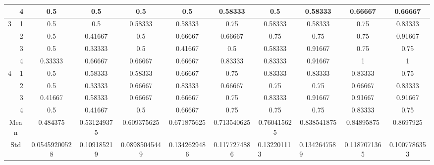 \documentclass[draft,dvipsnames]{drexel-thesis}
\begin{document}
\begin{thesis}
\begin{table}[!t]
{\begin{tabular}{|c|c|c|c|c|c|c|c|c|c|c|}
                      & 4                   & 0.5           & 0.5         & 0.5           & 0.5          & 0.58333      & 0.5                              & 0.58333                           & 0.66667      & 0.66667      \\ \hline
\multirow{4}{*}{3}    & 1                   & 0.5           & 0.5         & 0.58333       & 0.58333      & 0.75         & 0.58333                          & 0.58333                           & 0.75         & 0.83333      \\ \cline{2-11} 
                      & 2                   & 0.5           & 0.41667     & 0.5           & 0.66667      & 0.66667      & 0.75                             & 0.75                              & 0.75         & 0.91667      \\ \cline{2-11} 
                      & 3                   & 0.5           & 0.33333     & 0.5           & 0.41667      & 0.5          & 0.58333                          & 0.91667                           & 0.75         & 0.75         \\ \cline{2-11} 
                      & 4                   & 0.33333       & 0.66667     & 0.66667       & 0.66667      & 0.83333      & 0.83333                          & 0.91667                           & 1            & 1            \\ \hline
\multirow{4}{*}{4}    & 1                   & 0.5           & 0.58333     & 0.58333       & 0.66667      & 0.75         & 0.83333                          & 0.83333                           & 0.83333      & 0.75         \\ \cline{2-11} 
                      & 2                   & 0.5           & 0.33333     & 0.66667       & 0.83333      & 0.66667      & 0.75                             & 0.75                              & 0.66667      & 0.83333      \\ \cline{2-11} 
                      & 3                   & 0.41667       & 0.58333     & 0.66667       & 0.66667      & 0.75         & 0.83333                          & 0.91667                           & 0.91667      & 0.91667      \\ \cline{2-11} 
                      & 4                   & 0.5           & 0.41667     & 0.5           & 0.66667      & 0.75         & 0.75                             & 0.75                              & 0.83333      & 0.75         \\ \hline
\multicolumn{2}{|c|}{Mean}                  & 0.484375      & 0.531249375 & 0.609375625   & 0.671875625  & 0.713540625  & 0.760415625                      & 0.838541875                       & 0.84895875   & 0.8697925    \\ \hline
\multicolumn{2}{|c|}{Std}                   & 0.05459200528 & 0.109185219 & 0.08985045449 & 0.1342629486 & 0.1177274886 & \multicolumn{1}{l|}{0.132201113} & \multicolumn{1}{l|}{0.1342647589} & 0.1187071365 & 0.1007786353 \\ \hline
\end{tabular}}
\end{table}


\end{thesis}
\end{document}
